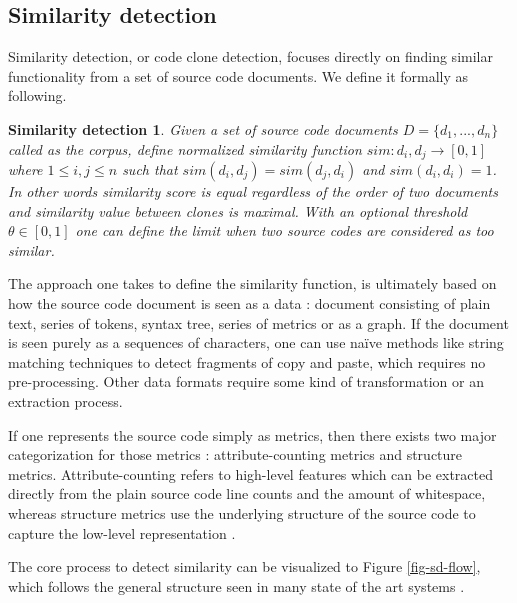 \subsection{Similarity detection} \label{chap-sd}

Similarity detection, or code clone detection, focuses directly on finding similar functionality from a set of source code documents. We define it formally as following.

\newtheorem*{smd1}{Similarity detection}

\begin{smd1}
Given a set of source code documents $D = \{d_1,...,d_n\}$ called as the corpus, define normalized similarity function $sim: d_i, d_j \rightarrow [0, 1]$ where $1 \leq i, j \leq n$ such that $sim(d_i, d_j) = sim(d_j, d_i)$ and $sim(d_i, d_i) = 1$. In other words similarity score is equal regardless of the order of two documents and similarity value between clones is maximal. With an optional threshold $\theta \in [0, 1]$ one can define the limit when two source codes are considered as too similar. 
\end{smd1}


The approach one takes to define the similarity function, is ultimately based on how the source code document is seen as a data \cite{Roy:2009:CEC:1530898.1531101}: document consisting of plain text, series of tokens, syntax tree, series of metrics or as a graph. If the document is seen purely as a sequences of characters, one can use naïve methods like string matching techniques to detect fragments of copy and paste, which requires no pre-processing. Other data formats require some kind of transformation or an extraction process. 


If one represents the source code simply as metrics, then there exists two major categorization for those metrics \cite{Roy:2009:CEC:1530898.1531101}: attribute-counting metrics and structure metrics. Attribute-counting refers to high-level features which can be extracted directly from the plain source code \eg line counts and the amount of whitespace, whereas structure metrics use the underlying structure of the source code to capture the low-level representation \cite{Verco:1996:SDS:369585.369598}.


The core process to detect similarity can be visualized to Figure \ref{fig-sd-flow}, which follows the general structure seen in many state of the art systems \cite{Roy:2009:CEC:1530898.1531101}.

